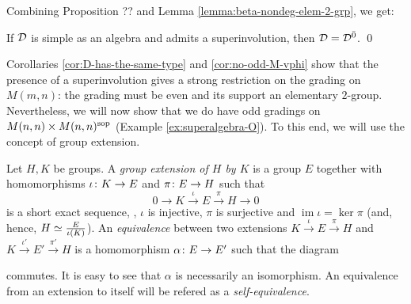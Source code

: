 Combining Proposition ??  %
and Lemma \ref{lemma:beta-nondeg-elem-2-grp}, we get:

\begin{cor}\label{cor:no-odd-M-vphi}
	If $\mathcal{D}$ is simple as an algebra and admits a superinvolution, then $\mathcal{D} = \mathcal{D}^{\bar0}$. \qed
\end{cor}


Corollaries \ref{cor:D-has-the-same-type} and \ref{cor:no-odd-M-vphi} show that the presence of a superinvolution gives a strong restriction on the grading on $M(m,n)$: the grading must be even and its support an elementary $2$-group.
Nevertheless, we will now show that we do have odd gradings on $M(n,n)\times M(n,n)^{\mathrm{sop}}$ (Example \ref{ex:superalgebra-O}).
To this end, we will use the concept of group extension.

\begin{defi}
	Let $H, K$ be groups.
	A \emph{group extension of $H$ by $K$} is a group $E$ together with homomorphisms $\iota\colon K \to E$ and $\pi\colon E \to H$ such that
	\begin{equation}\label{eq:short-exact-sequence}
		0 \rightarrow K \xrightarrow{\iota} E \xrightarrow{\pi} H \rightarrow 0
	\end{equation}
	is a short exact sequence, \ie,
	$\iota$ is injective, $\pi$ is surjective and $\operatorname{im} \iota = \ker \pi$ (and, hence, $H \simeq \frac{E}{\iota(K)}$).
	An \emph{equivalence} between two extensions $K \xrightarrow{\iota} E \xrightarrow{\pi} H$ and $K \xrightarrow{\iota'} E' \xrightarrow{\pi'} H$ is a homomorphism $\alpha\colon E \to E'$ such that the diagram
	\begin{center}
	\end{center}
	commutes.
	It is easy to see that $\alpha$ is necessarily an isomorphism.
	An equivalence from an extension to itself will be refered as a \emph{self-equivalence}.
\end{defi}

